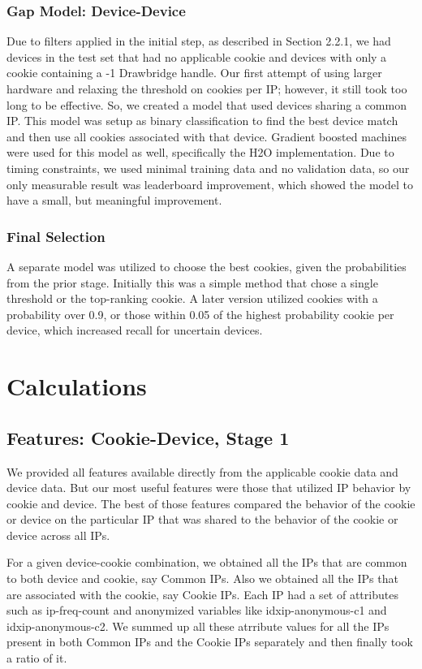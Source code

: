 \documentclass[9pt, journal]{IEEEtran}
\begin{document}
\subsubsection{Gap Model: Device-Device}
Due to filters applied in the initial step, as described in Section 2.2.1, we had devices in the test set that had no applicable cookie and devices with only a cookie containing a -1 Drawbridge handle.
Our first attempt of using larger hardware and relaxing the threshold on cookies per IP; however, it still took too long to be effective.
So, we created a model that used devices sharing a common IP. This model was setup as binary classification to find the best device match and then use all cookies associated with that device.
Gradient boosted machines were used for this model as well, specifically the H2O implementation. Due to timing constraints, we used minimal training data and no validation data, so our only measurable result was leaderboard improvement, which showed the model to have a small, but meaningful improvement.

\subsubsection{Final Selection}
A separate model was utilized to choose the best cookies, given the probabilities from the prior stage. 
Initially this was a simple method that chose a single threshold or the top-ranking cookie. 
A later version utilized cookies with a probability over 0.9, or those within 0.05 of the highest probability cookie per device, which increased recall for uncertain devices.


\section{Calculations}
\subsection{Features: Cookie-Device, Stage 1}
We provided all features available directly from the applicable cookie data and device data.
But our most useful features were those that utilized IP behavior by cookie and device.
The best of those features compared the behavior of the cookie or device on the particular IP that was shared to the behavior of the cookie or device across all IPs.

For a given device-cookie combination, we obtained all the IPs that are common to both device and cookie, say Common IPs. 
Also we obtained all the IPs that are associated with the cookie, say Cookie IPs. 
Each IP had a set of attributes such as ip-freq-count and anonymized variables like idxip-anonymous-c1 and idxip-anonymous-c2. 
We summed up all these atrribute values for all the IPs present in both Common IPs and the Cookie IPs separately and then finally took a ratio of it.
\end{document}
